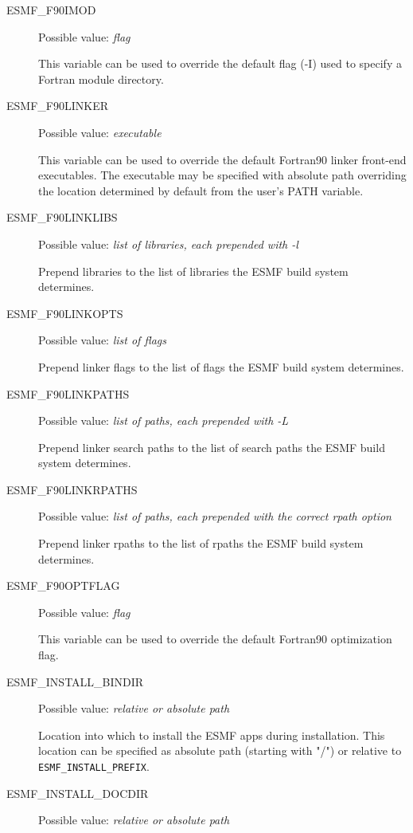 \begin{description}
\item[ESMF\_F90IMOD]
Possible value: {\em flag}

This variable can be used to override the default flag (-I) used to specify a
Fortran module directory.

\item[ESMF\_F90LINKER]
Possible value: {\em executable}

This variable can be used to override the default Fortran90 linker
front-end executables. The executable may be specified with absolute path
overriding the location determined by default from the user's PATH variable.

\item[ESMF\_F90LINKLIBS]
Possible value: {\em list of libraries, each prepended with -l}

Prepend libraries to the list of libraries the ESMF build system determines.

\item[ESMF\_F90LINKOPTS]
Possible value: {\em list of flags}

Prepend linker flags to the list of flags the ESMF build system determines.

\item[ESMF\_F90LINKPATHS]
Possible value: {\em list of paths, each prepended with -L}

Prepend linker search paths to the list of search paths the ESMF build system
determines.

\item[ESMF\_F90LINKRPATHS]
Possible value: {\em list of paths, each prepended with the correct rpath option}

Prepend linker rpaths to the list of rpaths the ESMF build system determines.

\item[ESMF\_F90OPTFLAG]
Possible value: {\em flag}

This variable can be used to override the default  Fortran90 optimization flag.

\item[ESMF\_INSTALL\_BINDIR]
Possible value: {\em relative or absolute path}

Location into which to install the ESMF apps during installation. This
location can be specified as absolute path (starting with "/") or relative to
{\tt ESMF\_INSTALL\_PREFIX}.

\item[ESMF\_INSTALL\_DOCDIR]
Possible value: {\em relative or absolute path}


\end{description}
